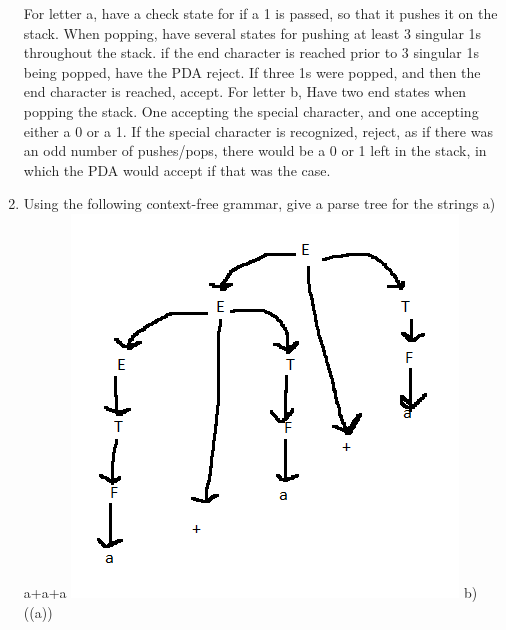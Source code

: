 \documentclass{article}
\begin{document}
\begin{enumerate}
\newline
\newline
For letter a, have a check state for if a 1 is passed, so that it pushes it on the stack. When popping, have several states for pushing at least 3 singular 1s throughout the stack. if the end character is reached prior to 3 singular 1s being popped, have the PDA reject. If three 1s were popped, and then the end character is reached, accept.
\newline
\newline
For letter b, Have two end states when popping the stack. One accepting the special character, and one accepting either a 0 or a 1. If the special character is recognized, reject, as if there was an odd number of pushes/pops, there would be a 0 or 1 left in the stack, in which the PDA would accept if that was the case.
\item
Using the following context-free grammar, give a parse tree for the strings
\newline
a) a+a+a
\newline
\includegraphics[scale=0.75]{CFG1}
\newline
b) ((a))
\newline

\end{enumerate}
\end{document}
